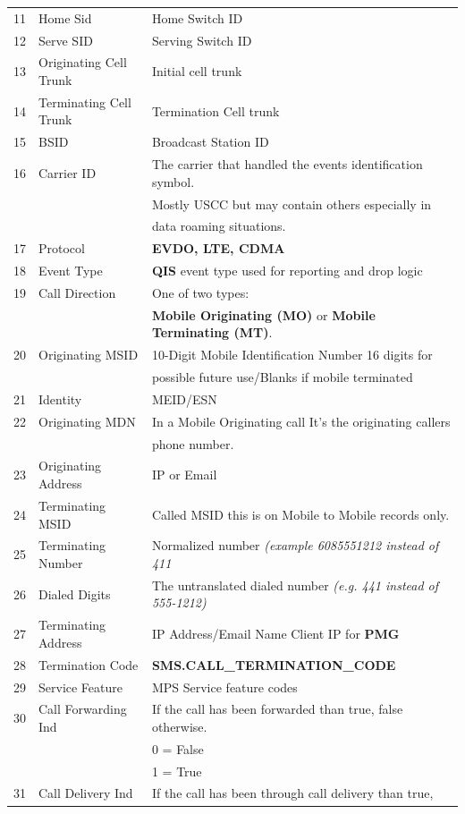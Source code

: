 \documentclass[12pt,twoside]{article}
\begin{document}
\begin{longtable}{c|l|l}
11 & Home Sid & Home Switch ID\\
12 & Serve SID & Serving Switch ID\\
13 & Originating Cell Trunk & Initial cell trunk\\
14 & Terminating Cell Trunk & Termination Cell trunk\\
15 & BSID & Broadcast Station ID\\
16 & Carrier ID & The carrier that handled the events identification symbol.\\
 &  & Mostly USCC but may contain others especially in\\
 &  & data roaming situations.\\
17 & Protocol & \textbf{EVDO, LTE, CDMA}\\
18 & Event Type & \textbf{QIS} event type used for reporting and drop logic\\
19 & Call Direction & One of two types:\\
 &  & \textbf{Mobile Originating (MO)} or \textbf{Mobile Terminating (MT)}.\\
20 & Originating MSID & 10-Digit Mobile Identification Number 16 digits for\\
 &  & possible future use/Blanks if mobile terminated\\
21 & Identity & MEID/ESN\\
22 & Originating MDN & In a Mobile Originating call It's the originating callers\\
 &  & phone number.\\
23 & Originating Address & IP or Email\\
24 & Terminating MSID & Called MSID this is on Mobile to Mobile records only.\\
25 & Terminating Number & Normalized number \emph{(example 6085551212 instead of 411}\\
26 & Dialed Digits & The untranslated dialed number \emph{(e.g. 441 instead of 555-1212)}\\
27 & Terminating Address & IP Address/Email Name Client IP for \textbf{PMG}\\
28 & Termination Code & \textbf{SMS.CALL\_TERMINATION\_CODE}\\
29 & Service Feature & MPS Service feature codes\\
30 & Call Forwarding Ind & If the call has been forwarded than true, false otherwise.\\
 &  & 0 = False\\
 &  & 1 = True\\
31 & Call Delivery Ind & If the call has been through call delivery than true,\\

\end{longtable}
\end{document}
